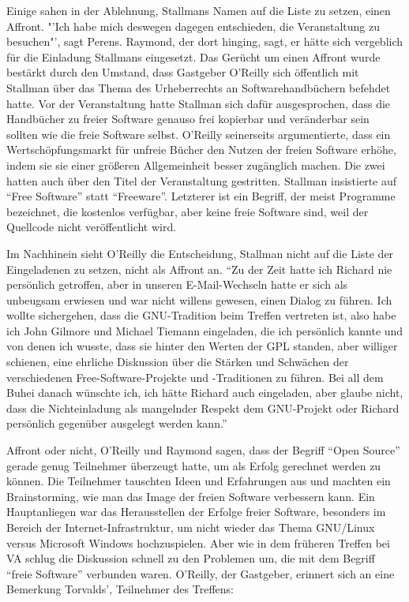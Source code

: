Einige sahen in der Ablehnung, Stallmans Namen auf die Liste zu setzen, einen Affront. "'Ich habe mich deswegen dagegen entschieden, die Veranstaltung zu besuchen"', sagt Perens. Raymond, der dort hinging, sagt, er hätte sich vergeblich für die Einladung Stallmans eingesetzt. Das Gerücht um einen Affront wurde bestärkt durch den Umstand, dass Gastgeber O'Reilly sich öffentlich mit Stallman über das Thema des Urheberrechts an Softwarehandbüchern befehdet hatte. Vor der Veranstaltung hatte Stallman sich dafür ausgesprochen, dass die Handbücher zu freier Software genauso frei kopierbar und veränderbar sein sollten wie die freie Software selbst. O'Reilly seinerseits argumentierte, dass ein Wertschöpfungsmarkt für unfreie Bücher den Nutzen der freien Software erhöhe, indem sie sie einer größeren Allgemeinheit besser zugänglich machen. Die zwei hatten auch über den Titel der Veranstaltung gestritten. Stallman insistierte auf "`Free Software"' statt "`Freeware"'. Letzterer ist ein Begriff, der meist Programme bezeichnet, die kostenlos verfügbar, aber keine freie Software sind, weil der Quellcode nicht veröffentlicht wird.

Im Nachhinein sieht O'Reilly die Entscheidung, Stallman nicht auf die Liste der Eingeladenen zu setzen, nicht als Affront an. "`Zu der Zeit hatte ich Richard nie persönlich getroffen, aber in unseren E-Mail-Wechseln hatte er sich als unbeugsam erwiesen und war nicht willens gewesen, einen Dialog zu führen. Ich wollte sichergehen, dass die GNU-Tradition beim Treffen vertreten ist, also habe ich John Gilmore und Michael Tiemann eingeladen, die ich persönlich kannte und von denen ich wusste, dass sie hinter den Werten der GPL standen, aber williger schienen, eine ehrliche Diskussion über die Stärken und Schwächen der verschiedenen Free-Software-Projekte und -Traditionen zu führen. Bei all dem Buhei danach wünschte ich, ich hätte Richard auch eingeladen, aber glaube nicht, dass die Nichteinladung als mangelnder Respekt dem GNU-Projekt oder Richard persönlich gegenüber ausgelegt werden kann."'

Affront oder nicht, O'Reilly und Raymond sagen, dass der Begriff "`Open Source"' gerade genug Teilnehmer überzeugt hatte, um als Erfolg gerechnet werden zu können. Die Teilnehmer tauschten Ideen und Erfahrungen aus und machten ein Brainstorming, wie man das Image der freien Software verbessern kann. Ein Hauptanliegen war das Herausstellen der Erfolge freier Software, besonders im Bereich der Internet-Infrastruktur, um nicht wieder das Thema GNU/Linux versus Microsoft Windows hochzuspielen. Aber wie in dem früheren Treffen bei VA schlug die Diskussion schnell zu den Problemen um, die mit dem Begriff "`freie Software"' verbunden waren. O'Reilly, der Gastgeber, erinnert sich an eine Bemerkung Torvalds', Teilnehmer des Treffens:


